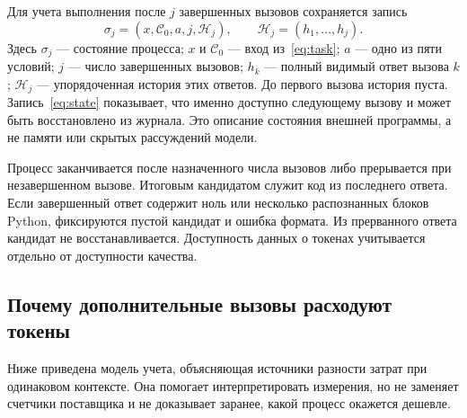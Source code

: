 Для учета выполнения после $j$ завершенных вызовов сохраняется запись
\begin{equation}
\sigma_j=(x,\mathcal{C}_0,a,j,\mathcal{H}_j),
\qquad \mathcal{H}_j=(h_1,\ldots,h_j).
\label{eq:state}
\end{equation}
Здесь $\sigma_j$ --- состояние процесса; $x$ и $\mathcal{C}_0$ --- вход из~\eqref{eq:task}; $a$ --- одно из пяти условий; $j$ --- число завершенных вызовов; $h_k$ --- полный видимый ответ вызова $k$; $\mathcal{H}_j$ --- упорядоченная история этих ответов. До первого вызова история пуста. Запись~\eqref{eq:state} показывает, что именно доступно следующему вызову и может быть восстановлено из журнала. Это описание состояния внешней программы, а не памяти или скрытых рассуждений модели.

Процесс заканчивается после назначенного числа вызовов либо прерывается при незавершенном вызове. Итоговым кандидатом служит код из последнего ответа. Если завершенный ответ содержит ноль или несколько распознанных блоков Python, фиксируются пустой кандидат и ошибка формата. Из прерванного ответа кандидат не восстанавливается. Доступность данных о токенах учитывается отдельно от доступности качества.

\subsection{Почему дополнительные вызовы расходуют токены}
Ниже приведена модель учета, объясняющая источники разности затрат при одинаковом контексте. Она помогает интерпретировать измерения, но не заменяет счетчики поставщика и не доказывает заранее, какой процесс окажется дешевле.

